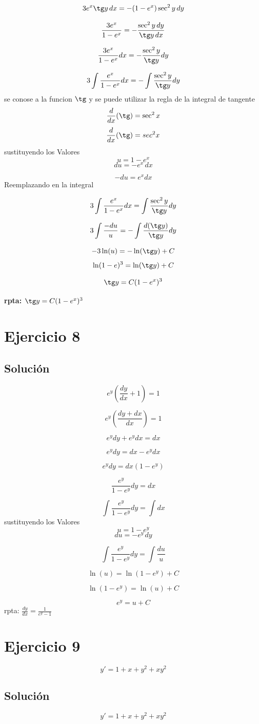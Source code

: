 \documentclass[12pt,a4paper]{article}
\begin{document}
\begin{multicols}{2}
\[3e^x\tg y\,dx=-(1-e^x)\sec^2 y\,dy\] 

\[\frac{3e^x}{1-e^x}=-\frac{\sec^2 y\,dy}{\tg y\,dx}\] 

\[\frac{3e^x}{1-e^x}dx=-\frac{\sec^2 y}{\tg y}dy\] 

\[3\int\frac{e^x}{1-e^x}dx=-\int\frac{\sec^2 y}{\tg y}dy\]  
\noindent
se conose a la funcion $\tg$ y se puede utilizar la regla de la integral de tangente \[\frac{d}{dx}(\tg)=\sec^2x\]
\[\frac{d}{dx}(\tg)=sec^2x\] 
\noindent
sustituyendo los Valores \[u=1-e^x\] \[du=-e^x\,dx\] 

\[-du=e^xdx\]
\noindent
Reemplazando en la integral 

\[3\int\frac{e^x}{1-e^x}dx=\int\frac{\sec^2 y}{\tg y}dy\] 

\[3\int\frac{-du}{u}=-\int\frac{d(\tg y)}{\tg y}dy\] 

\[-3\ln(u)=-\ln(\tg y)+C\] \[\ln(1-e)^3=\ln(\tg y)+C\] 

\[\tg y=C(1-e^x)^3\] 

\textbf{rpta: $\tg y=C(1-e^x)^3$}

\section*{Ejercicio 8}
\subsection*{Solución}
\[e^y(\frac{dy}{dx}+1)=1\]

\[e^y\left(\frac{dy +dx}{dx}\right)=1\]

\[e^ydy+e^ydx=dx\]

\[e^ydy=dx-e^ydx\]

\[e^ydy=dx(1-e^y)\]

\[\frac{e^y}{1-e^y}dy=dx\]

\[\int\frac{e^y}{1-e^y}dy=\int dx\]
\noindent
sustituyendo los Valores \[u=1-e^y\] \[du=-e^y\,dy\] 

\[\int\frac{e^y}{1-e^y}dy=\int\frac{du}{u}\]

\[\ln(u)=\ln(1-e^y)+C\]

\[\ln(1-e^y)=\ln(u)+C\]

\[e^y=u+C\]
rpta: $\frac{dy}{dx}=\frac{1}{e^y-1}$
\section*{Ejercicio 9}

\[y\prime=1+x+y^2+xy^2\]

\subsection*{Solución}
\[y\prime=1+x+y^2+xy^2\]


\end{multicols}
\end{document}
